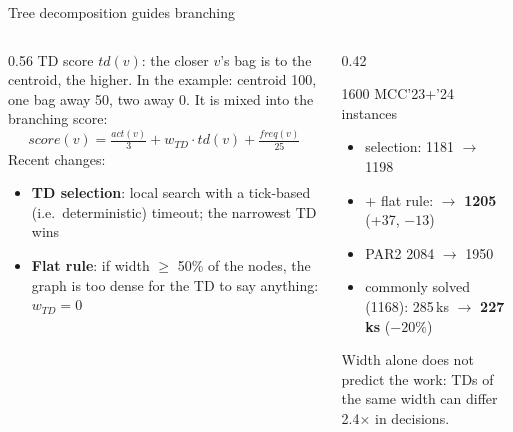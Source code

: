 \documentclass[aspectratio=169]{beamer}
\begin{document}
\begin{frame}{Tree decomposition guides branching}
  \begin{columns}[T]
    \begin{column}{0.56\textwidth}
      \small
      TD score $\mathit{td}(v)$: the closer $v$'s bag is to the centroid,
      the higher. In the example: \colorbox{stageC!20}{centroid} 100,
      \colorbox{stageA!15}{one bag away} 50, \colorbox{ioBox!15}{two away} 0.
      It is mixed into the branching score:
      \[ \mathit{score}(v) = \tfrac{\mathit{act}(v)}{3} + w_{TD}\cdot \mathit{td}(v) + \tfrac{\mathit{freq}(v)}{25} \]
      Recent changes:
      \begin{itemize}
        \item \textbf{TD selection}: local search with a tick-based
          (i.e.\ deterministic) timeout; the narrowest TD wins
        \item \textbf{Flat rule}: if width $\ge$ 50\% of the nodes, the
          graph is too dense for the TD to say anything: $w_{TD}=0$
      \end{itemize}
    \end{column}
    \begin{column}{0.42\textwidth}
      \begin{exampleblock}{\small 1600 MCC'23+'24 instances}
        \small
        \begin{itemize}
          \item selection: 1181 $\to$ 1198
          \item + flat rule: $\to$ \textbf{1205}\\ (+37, $-13$)
          \item PAR2 2084 $\to$ 1950
          \item commonly solved (1168): 285\,ks $\to$ \textbf{227\,ks} ($-20\%$)
        \end{itemize}
      \end{exampleblock}
      \scriptsize Width alone does not predict the work: TDs of the same
      width can differ 2.4$\times$ in decisions.
    \end{column}
  \end{columns}
\end{frame}

\end{document}
